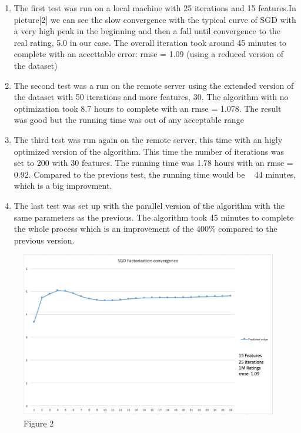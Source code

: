 \documentclass{sig-alternate-05-2015}
\begin{document}
\begin{enumerate}
  \item The first test was run on a local machine with 25 iterations and 15 features.In picture[2] we can see the slow convergence with the typical curve of SGD with a
  very high peak in the beginning and then a fall until convergence to the real rating, 5.0 in our case. The overall iteration took around 45 minutes to complete with an
  accettable error: rmse = 1.09 (using a reduced version of the dataset)
  \item The second test was a run on the remote server using the extended version of the dataset with  50 iterations and more features, 30. The algorithm with no optimization
  took 8.7 hours to complete with an rmse = 1.078. The result was good but the running time was out of any acceptable range
  \item The third test was run again on the remote server, this time with an higly optimized version of the algorithm. This time the number of iterations was set to 200 with 30 features.
  The running time was 1.78 hours with an rmse = 0.92. Compared to the previous test, the running time would be ~ 44 minutes, which is a big improvment.
  \item The last test was set up with the parallel version of the algorithm with the same parameters as the previous. The algorithm took 45 minutes to complete the whole process
  which is an improvement of the 400$\%$ compared to the previous version.
\end{enumerate}
\begin{figure}
    \caption{Figure 2}
    \centering
    \includegraphics[scale=0.175]{chart.png}
\end{figure}
\end{document}
